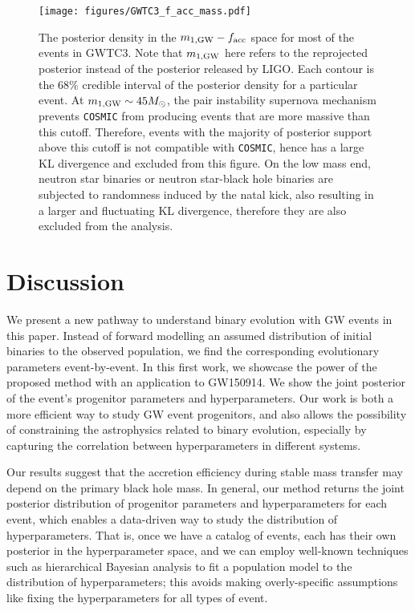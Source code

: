 \documentclass[twocolumn]{aastex631}
\begin{document}
\begin{figure}
\texttt{[image: figures/GWTC3\_f\_acc\_mass.pdf]}
\caption{
    The posterior density in the $m_{1,{\rm GW}}-f_{\rm acc}$ space for most of the events in GWTC3.
    Note that $m_{1,{\rm GW}}$ here refers to the reprojected posterior instead of the posterior released by LIGO.
    Each contour is the $68\%$ credible interval of the posterior density for a particular event.
    At $m_{1,{\rm GW}} \sim 45 M_{\odot}$, the pair instability supernova mechanism prevents \texttt{COSMIC} from producing events that are more massive than this cutoff.
    Therefore, events with the majority of posterior support above this cutoff is not compatible with \texttt{COSMIC}, hence has a large KL divergence and excluded from this figure.
    On the low mass end, neutron star binaries or neutron star-black hole binaries are subjected to randomness induced by the natal kick,
    also resulting in a larger and fluctuating KL divergence, therefore they are also excluded from the analysis.
}
\label{fig:GWTC3_f_acc_mass}
\end{figure}

\section{Discussion}
\label{sec:discussion}


We present a new pathway to understand binary evolution with GW events in this
paper. Instead of forward modelling an assumed distribution of initial binaries
to the observed population, we find the corresponding evolutionary parameters
event-by-event. In this first work, we showcase the power of the proposed method
with an application to GW150914. We show the joint posterior of the event's
progenitor parameters and hyperparameters.  Our work is both a more efficient
way to study GW event progenitors, and also allows the possibility of
constraining the astrophysics related to binary evolution, especially by
capturing the correlation between hyperparameters in different systems.

Our results suggest that the accretion efficiency during stable mass transfer
may depend on the primary black hole mass.  In general, our method returns the
joint posterior distribution of progenitor parameters and hyperparameters for
each event, which enables a data-driven way to study the distribution of
hyperparameters.  That is, once we have a catalog of events, each has their own
posterior in the hyperparameter space, and we can employ well-known techniques
such as hierarchical Bayesian analysis to fit a population model to the
distribution of hyperparameters; this avoids making overly-specific assumptions
like fixing the hyperparameters for all types of event.
\end{document}
